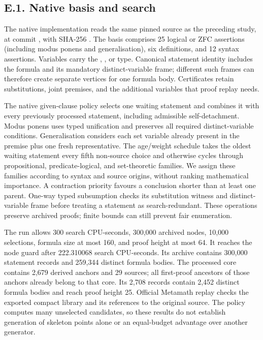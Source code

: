 \documentclass[pdflatex,sn-basic,Numbered]{sn-jnl}
\begin{document}
\subsection*{E.1. Native basis and search}\label{e.1.-native-basis-and-search}

The native implementation reads the same pinned  source as the preceding study, at commit , with SHA-256 . The basis comprises 25 logical or ZFC assertions (including modus ponens and generalisation), six definitions, and 12 syntax assertions. Variables carry the , , or  type. Canonical statement identity includes the formula and its mandatory distinct-variable frame; different such frames can therefore create separate vertices for one formula body. Certificates retain substitutions, joint premises, and the additional variables that proof replay needs.

The native given-clause policy selects one waiting statement and combines it with every previously processed statement, including admissible self-detachment. Modus ponens uses typed unification and preserves all required distinct-variable conditions. Generalisation considers each set variable already present in the premise plus one fresh representative. The age/weight schedule takes the oldest waiting statement every fifth non-source choice and otherwise cycles through propositional, predicate-logical, and set-theoretic families. We assign these families according to syntax and source origins, without ranking mathematical importance. A contraction priority favours a conclusion shorter than at least one parent. One-way typed subsumption checks its substitution witness and distinct-variable frame before treating a statement as search-redundant. These operations preserve archived proofs; finite bounds can still prevent fair enumeration.

The run allows 300 search CPU-seconds, 300,000 archived nodes, 10,000 selections, formula size at most 160, and proof height at most 64. It reaches the node guard after 222.310068 search CPU-seconds. Its archive contains 300,000 statement records and 259,344 distinct formula bodies. The processed core contains 2,679 derived anchors and 29 sources; all first-proof ancestors of those anchors already belong to that core. Its 2,708 records contain 2,452 distinct formula bodies and reach proof height 25. Official Metamath replay checks the exported compact library and its references to the original source. The policy computes many unselected candidates, so these results do not establish generation of skeleton points alone or an equal-budget advantage over another generator.
\end{document}

